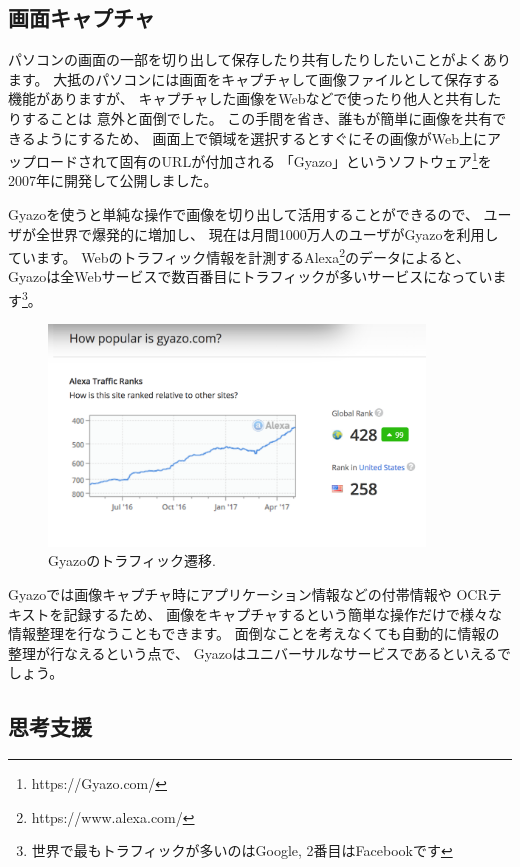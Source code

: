 \documentclass[topics]{compsoft} %
\begin{document}
\subsection{画面キャプチャ}

パソコンの画面の一部を切り出して保存したり共有したりしたいことがよくあります。
大抵のパソコンには画面をキャプチャして画像ファイルとして保存する機能がありますが、
キャプチャした画像をWebなどで使ったり他人と共有したりすることは
意外と面倒でした。
この手間を省き、誰もが簡単に画像を共有できるようにするため、
画面上で領域を選択するとすぐにその画像がWeb上にアップロードされて固有のURLが付加される
「Gyazo」というソフトウェア\footnote{
  \textsf{https:{\slash}{\slash}Gyazo.com{\slash}}
}を2007年に開発して公開しました。

Gyazoを使うと単純な操作で画像を切り出して活用することができるので、
ユーザが全世界で爆発的に増加し、
現在は月間1000万人のユーザがGyazoを利用しています。
%
Webのトラフィック情報を計測するAlexa\footnote{
  \textsf{https:{\slash}{\slash}www.alexa.com{\slash}}
}のデータによると、
Gyazoは全Webサービスで数百番目にトラフィックが多いサービスになっています\footnote{
  世界で最もトラフィックが多いのはGoogle, 2番目はFacebookです
}。

\begin{figure}[h]
  \includegraphics[width=10cm,bb=0 0 1134 668]{figures/2595e48e8346b423d6e6c1d23daf10f4.png}
  \caption{Gyazoのトラフィック遷移.}
  \label{alexa}
\end{figure}

Gyazoでは画像キャプチャ時にアプリケーション情報などの付帯情報や
OCRテキストを記録するため、
画像をキャプチャするという簡単な操作だけで様々な情報整理を行なうこともできます。
面倒なことを考えなくても自動的に情報の整理が行なえるという点で、
Gyazoはユニバーサルなサービスであるといえるでしょう。

\subsection{思考支援}
\end{document}
